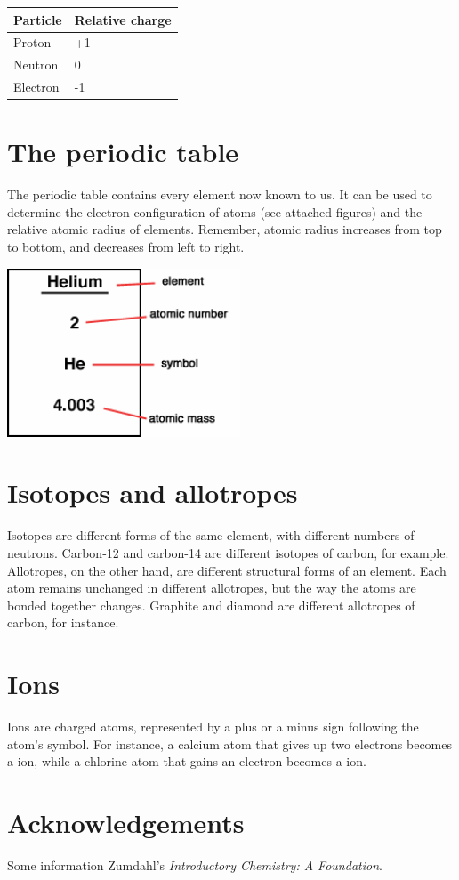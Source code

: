 \documentclass[]{article}
\begin{document}
\vspace{5mm}
\begin{tabular}{ | l | l |}
    \hline
    Particle & Relative charge \\ \hline
    Proton &  +1 \\ \hline 
    Neutron & 0 \\ \hline
    Electron & -1 \\ \hline
\end{tabular}

\section{The periodic table}
The periodic table contains every element now known to us. It can be used to determine the electron configuration of atoms (see attached figures) and the relative atomic radius of elements. Remember, atomic radius increases from top to bottom, and decreases from left to right.

\vspace{5mm}
\includegraphics[height=5cm]{helium.png}

\section{Isotopes and allotropes}
Isotopes are different forms of the same element, with different numbers of neutrons. Carbon-12 and carbon-14 are different isotopes of carbon, for example. Allotropes, on the other hand, are different structural forms of an element. Each atom remains unchanged in different allotropes, but the way the atoms are bonded together changes. Graphite and diamond are different allotropes of carbon, for instance.

\section{Ions}
Ions are charged atoms, represented by a plus or a minus sign following the atom's symbol. For instance, a calcium atom that gives up two electrons becomes a  ion, while a chlorine atom that gains an electron becomes a  ion.

\section{Acknowledgements}

Some information Zumdahl's \emph{Introductory Chemistry: A Foundation}.
\end{document}
